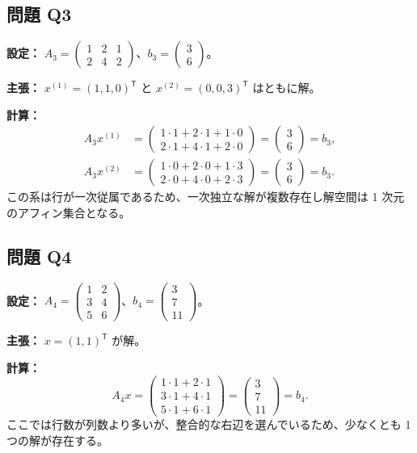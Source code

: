 \documentclass[a4paper]{ltjsarticle}
\begin{document}
\subsection{問題 Q3}
\textbf{設定：} $A_3 = \begin{pmatrix}1 & 2 & 1\\ 2 & 4 & 2\end{pmatrix}$、$b_3 = \begin{pmatrix}3\\6\end{pmatrix}$。
\par
\textbf{主張：} $x^{(1)} = (1,1,0)^\mathsf{T}$ と $x^{(2)} = (0,0,3)^\mathsf{T}$ はともに解。
\par
\textbf{計算：}
\begin{align*}
A_3 x^{(1)} &= \begin{pmatrix}1 \cdot 1 + 2 \cdot 1 + 1 \cdot 0\\ 2 \cdot 1 + 4 \cdot 1 + 2 \cdot 0\end{pmatrix} = \begin{pmatrix}3\\6\end{pmatrix} = b_3,\\
A_3 x^{(2)} &= \begin{pmatrix}1 \cdot 0 + 2 \cdot 0 + 1 \cdot 3\\ 2 \cdot 0 + 4 \cdot 0 + 2 \cdot 3\end{pmatrix} = \begin{pmatrix}3\\6\end{pmatrix} = b_3.
\end{align*}
この系は行が一次従属であるため、一次独立な解が複数存在し解空間は 1 次元のアフィン集合となる。

\subsection{問題 Q4}
\textbf{設定：} $A_4 = \begin{pmatrix}1 & 2\\ 3 & 4\\ 5 & 6\end{pmatrix}$、$b_4 = \begin{pmatrix}3\\7\\11\end{pmatrix}$。
\par
\textbf{主張：} $x = (1,1)^\mathsf{T}$ が解。
\par
\textbf{計算：}
\[
A_4 x = \begin{pmatrix}1 \cdot 1 + 2 \cdot 1\\ 3 \cdot 1 + 4 \cdot 1\\ 5 \cdot 1 + 6 \cdot 1\end{pmatrix} = \begin{pmatrix}3\\7\\11\end{pmatrix} = b_4.
\]
ここでは行数が列数より多いが、整合的な右辺を選んでいるため、少なくとも 1 つの解が存在する。
\end{document}

